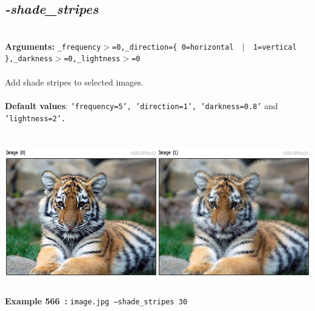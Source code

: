 \documentclass[a4paper,11pt,twoside]{book}
\begin{document}
\subsection{\emph{-shade\_stripes} }\vspace*{-0.5em}
~\\\textbf{Arguments: } 
{\small \texttt{\_frequency$>$=0,\_direction=\{ 0=horizontal ~$|$~ 1=vertical \},\_darkness$>$=0,\_lightness$>$=0}}\\~\\
Add shade stripes to selected images.
~\\~\\\textbf{Default values}: {\small \texttt{'frequency=5', 'direction=1', 'darkness=0.8'} and \texttt{'lightness=2'.}}
\begin{center}\includegraphics[keepaspectratio=true,height=7cm,width=\textwidth]{img/gmic_def566.jpg}\\
{\footnotesize \textbf{Example 566~:} \texttt{image.jpg --shade\_stripes 30}}
\end{center}
\end{document}
